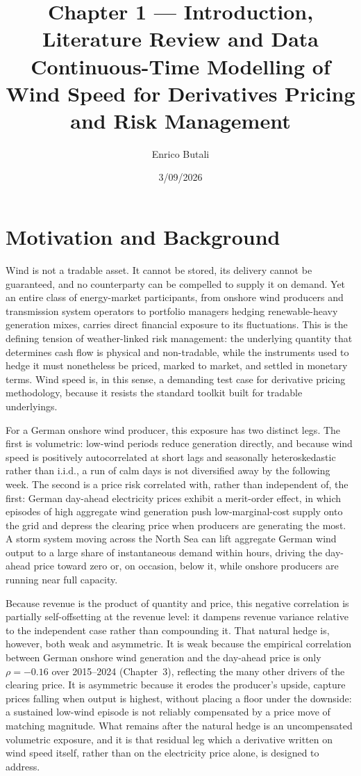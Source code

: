 \documentclass[11pt, a4paper, twoside]{article}
\title{\textbf{Chapter 1 --- Introduction, Literature Review and Data}\\[4pt]
\large Continuous-Time Modelling of Wind Speed for Derivatives Pricing and Risk Management}
\author{Enrico Butali}
\date{3/09/2026}
\begin{document}
\maketitle

\section{Motivation and Background}
\label{sec:motivation}
\tableofcontents
\newpage
Wind is not a tradable asset. It cannot be stored, its delivery cannot be guaranteed, and no counterparty can be compelled to supply it on demand. Yet an entire class of energy-market participants, from onshore wind producers and transmission system operators to portfolio managers hedging renewable-heavy generation mixes, carries direct financial exposure to its fluctuations. This is the defining tension of weather-linked risk management: the underlying quantity that determines cash flow is physical and non-tradable, while the instruments used to hedge it must nonetheless be priced, marked to market, and settled in monetary terms. Wind speed is, in this sense, a demanding test case for derivative pricing methodology, because it resists the standard toolkit built for tradable underlyings.

For a German onshore wind producer, this exposure has two distinct legs. The first is volumetric: low-wind periods reduce generation directly, and because wind speed is positively autocorrelated at short lags and seasonally heteroskedastic rather than i.i.d., a run of calm days is not diversified away by the following week. The second is a price risk correlated with, rather than independent of, the first: German day-ahead electricity prices exhibit a merit-order effect, in which episodes of high aggregate wind generation push low-marginal-cost supply onto the grid and depress the clearing price when producers are generating the most. A storm system moving across the North Sea can lift aggregate German wind output to a large share of instantaneous demand within hours, driving the day-ahead price toward zero or, on occasion, below it, while onshore producers are running near full capacity.

Because revenue is the product of quantity and price, this negative correlation is partially self-offsetting at the revenue level: it dampens revenue variance relative to the independent case rather than compounding it. That natural hedge is, however, both weak and asymmetric. It is weak because the empirical correlation between German onshore wind generation and the day-ahead price is only $\rho = -0.16$ over 2015--2024 (Chapter~3), reflecting the many other drivers of the clearing price. It is asymmetric because it erodes the producer's upside, capture prices falling when output is highest, without placing a floor under the downside: a sustained low-wind episode is not reliably compensated by a price move of matching magnitude. What remains after the natural hedge is an uncompensated volumetric exposure, and it is that residual leg which a derivative written on wind speed itself, rather than on the electricity price alone, is designed to address.
\end{document}
